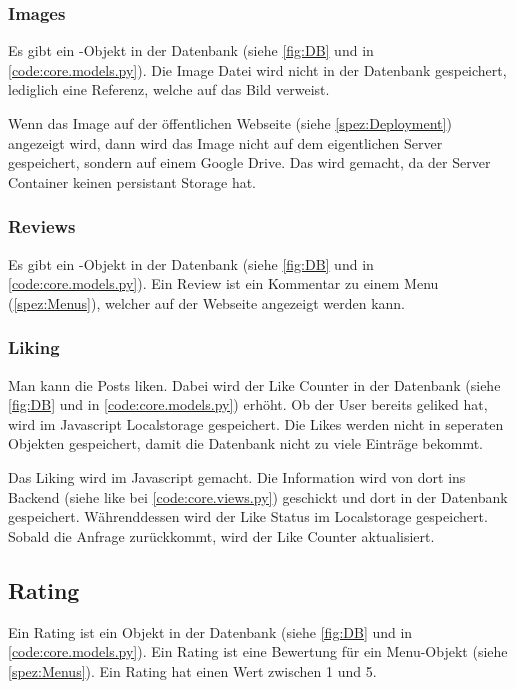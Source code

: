 \subsubsection{Images} \label{spez:Images}

Es gibt ein -Objekt in der Datenbank (siehe \ref{fig:DB} und in
\ref{code:core.models.py}). Die Image Datei wird nicht in der Datenbank
gespeichert, lediglich eine Referenz, welche auf das Bild verweist.

Wenn das Image auf der öffentlichen Webseite (siehe \ref{spez:Deployment}) angezeigt wird, dann
wird das Image nicht auf dem eigentlichen Server gespeichert, sondern auf einem
Google Drive. Das wird gemacht, da der Server Container keinen persistant
Storage hat.

\subsubsection{Reviews} \label{spez:Reviews}

Es gibt ein -Objekt in der Datenbank (siehe \ref{fig:DB} und in
\ref{code:core.models.py}). Ein Review ist ein Kommentar zu einem Menu
(\ref{spez:Menus}), welcher auf der Webseite angezeigt werden kann.

\subsubsection{Liking} \label{spez:Liking}

Man kann die Posts liken. Dabei wird der Like Counter in der Datenbank (siehe
\ref{fig:DB} und in \ref{code:core.models.py}) erhöht. Ob der User bereits
geliked hat, wird im Javascript Localstorage gespeichert. Die Likes werden nicht
in seperaten Objekten gespeichert, damit die Datenbank nicht zu viele Einträge
bekommt.

Das Liking wird im Javascript gemacht. Die Information wird von dort ins Backend
(siehe like bei \ref{code:core.views.py}) geschickt und dort in der Datenbank
gespeichert. Währenddessen wird der Like Status im Localstorage gespeichert.
Sobald die Anfrage zurückkommt, wird der Like Counter aktualisiert.

\subsection{Rating} \label{spez:Rating}

Ein Rating ist ein Objekt in der Datenbank (siehe \ref{fig:DB} und in
\ref{code:core.models.py}). Ein Rating ist eine Bewertung für ein Menu-Objekt
(siehe \ref{spez:Menus}). Ein Rating hat einen Wert zwischen 1 und 5.

